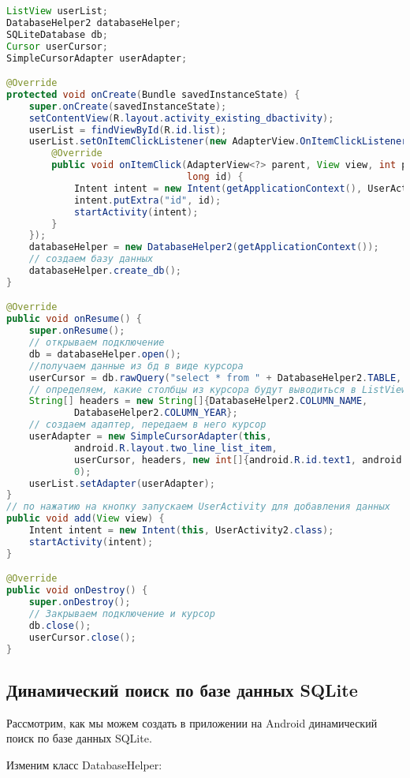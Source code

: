 \begin{lstlisting}[language=Java
	, label=lst:
	]
ListView userList;
DatabaseHelper2 databaseHelper;
SQLiteDatabase db;
Cursor userCursor;
SimpleCursorAdapter userAdapter;

@Override
protected void onCreate(Bundle savedInstanceState) {
	super.onCreate(savedInstanceState);
	setContentView(R.layout.activity_existing_dbactivity);
	userList = findViewById(R.id.list);
	userList.setOnItemClickListener(new AdapterView.OnItemClickListener() {
		@Override
		public void onItemClick(AdapterView<?> parent, View view, int position,
								long id) {
			Intent intent = new Intent(getApplicationContext(), UserActivity2.class);
			intent.putExtra("id", id);
			startActivity(intent);
		}
	});
	databaseHelper = new DatabaseHelper2(getApplicationContext());
	// создаем базу данных
	databaseHelper.create_db();
}

@Override
public void onResume() {
	super.onResume();
	// открываем подключение
	db = databaseHelper.open();
	//получаем данные из бд в виде курсора
	userCursor = db.rawQuery("select * from " + DatabaseHelper2.TABLE, null);
	// определяем, какие столбцы из курсора будут выводиться в ListView
	String[] headers = new String[]{DatabaseHelper2.COLUMN_NAME,
			DatabaseHelper2.COLUMN_YEAR};
	// создаем адаптер, передаем в него курсор
	userAdapter = new SimpleCursorAdapter(this,
			android.R.layout.two_line_list_item,
			userCursor, headers, new int[]{android.R.id.text1, android.R.id.text2},
			0);
	userList.setAdapter(userAdapter);
}
// по нажатию на кнопку запускаем UserActivity для добавления данных
public void add(View view) {
	Intent intent = new Intent(this, UserActivity2.class);
	startActivity(intent);
}

@Override
public void onDestroy() {
	super.onDestroy();
	// Закрываем подключение и курсор
	db.close();
	userCursor.close();
}
\end{lstlisting}

\subsection{Динамический поиск по базе данных SQLite}
Рассмотрим, как мы можем создать в приложении на Android динамический
поиск по базе данных SQLite.\par
Изменим класс DatabaseHelper:

